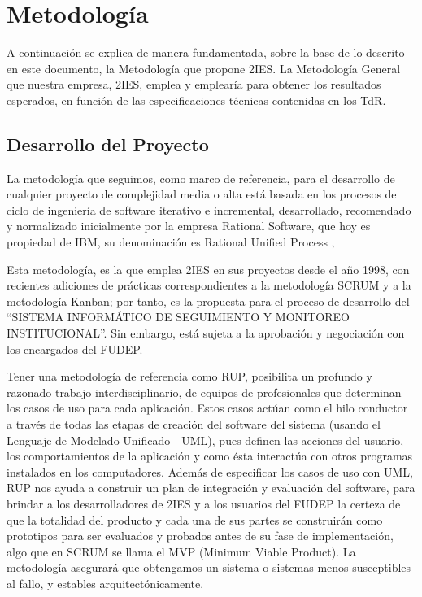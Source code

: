 \section{Metodología}

A continuación se explica de manera fundamentada, sobre la base de lo descrito en este documento, la Metodología que propone 2IES. La Metodología General que nuestra empresa, 2IES, emplea y emplearía para obtener los resultados esperados, en función de las especificaciones técnicas contenidas en los TdR. 

\subsection{Desarrollo del Proyecto}

La metodología que seguimos, como marco de referencia, para el desarrollo de cualquier proyecto de complejidad media o alta está basada en los procesos de ciclo de ingeniería de software iterativo e incremental, desarrollado, recomendado y normalizado inicialmente por la empresa Rational Software, que hoy es propiedad de IBM, su denominación es Rational Unified Process , 

Esta metodología, es la que emplea 2IES en sus proyectos desde el año 1998, con recientes adiciones de prácticas correspondientes a la metodología SCRUM y a la metodología Kanban; 
por tanto, es la propuesta para el proceso de desarrollo del “SISTEMA INFORMÁTICO DE SEGUIMIENTO Y MONITOREO INSTITUCIONAL”. 
Sin embargo, está sujeta a la aprobación y negociación con los encargados del FUDEP. 

Tener una metodología de referencia como RUP, posibilita un profundo y razonado trabajo interdisciplinario, de equipos de profesionales que determinan los casos de uso para cada aplicación. 
Estos casos actúan como el hilo conductor a través de todas las etapas de creación del software del sistema (usando el Lenguaje de Modelado Unificado - UML), 
pues definen las acciones del usuario, los comportamientos de la aplicación y como ésta interactúa con otros programas instalados en los computadores. 
Además de especificar los casos de uso con UML, RUP nos ayuda a construir un plan de integración y evaluación del software, para brindar a los desarrolladores de 2IES y a los usuarios del FUDEP la certeza de que la totalidad del producto y cada una de sus partes se construirán como prototipos para ser evaluados y probados antes de su fase de implementación, algo que en SCRUM se llama el MVP (Minimum Viable Product). 
La metodología asegurará que obtengamos un sistema o sistemas menos susceptibles al fallo, y estables arquitectónicamente.

